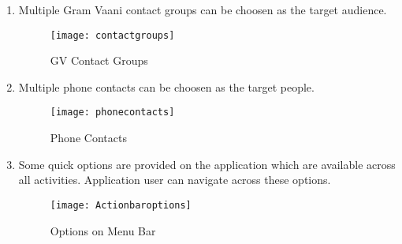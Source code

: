 \begin {enumerate}
\item Multiple Gram Vaani contact groups can be choosen as the target audience.
\begin{figure}[H]
\begin{center}   
\texttt{[image: contactgroups]}
\caption{GV Contact Groups}
\label{fig:contactgroups}
\end{center}
\end{figure}

\item Multiple phone contacts can be choosen as the target people.
\begin{figure}[H]
\begin{center}   
\texttt{[image: phonecontacts]}
\caption{Phone Contacts}
\label{fig:phonecontacts}
\end{center}
\end{figure}

\item Some quick options are provided on the application which are available across all activities. Application  user can navigate across these options.
\begin{figure}[H]
\begin{center}   
\texttt{[image: Actionbaroptions]}
\caption{Options on Menu Bar}
\label{fig:menubar}
\end{center}
\end{figure}

\end{enumerate}




